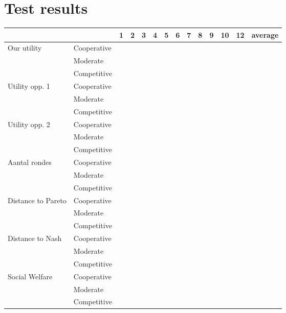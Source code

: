 \section{Test results}
 
\begin{table}[h]
\centering
\begin{tabular}{|l|l|c|c|c|c|c|c|c|c|c|c|c|c|}
\hline
&& 1 & 2 & 3 & 4 & 5 & 6 & 7 & 8 & 9 & 10 & 12 & average \\
            \hline
Our utility & Cooperative & &&&&&&&&&&& \\
            & Moderate    & &&&&&&&&&&& \\
            & Competitive & &&&&&&&&&&& \\
            \hline
Utility opp. 1 & Cooperative & &&&&&&&&&&& \\
            & Moderate    & &&&&&&&&&&& \\
            & Competitive & &&&&&&&&&&& \\
            \hline
Utility opp. 2 & Cooperative & &&&&&&&&&&& \\
            & Moderate    & &&&&&&&&&&& \\
            & Competitive & &&&&&&&&&&& \\
            \hline
Aantal rondes & Cooperative & &&&&&&&&&&& \\
            & Moderate    & &&&&&&&&&&& \\
            & Competitive & &&&&&&&&&&& \\
            \hline
Distance to Pareto & Cooperative & &&&&&&&&&&& \\
            & Moderate    & &&&&&&&&&&& \\
            & Competitive & &&&&&&&&&&& \\
            \hline
Distance to Nash & Cooperative & &&&&&&&&&&& \\
            & Moderate    & &&&&&&&&&&& \\
            & Competitive & &&&&&&&&&&& \\
            \hline
Social Welfare & Cooperative & &&&&&&&&&&& \\
            & Moderate    & &&&&&&&&&&& \\
            & Competitive & &&&&&&&&&&& \\
            \hline
\end{tabular}
\end{table}